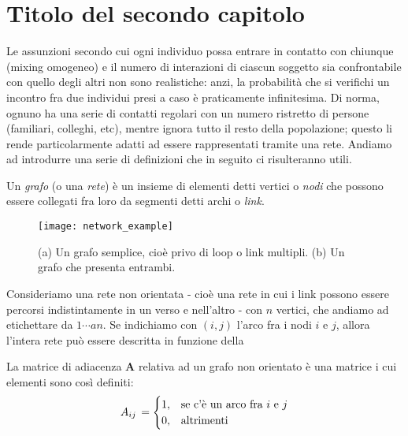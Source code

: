 \chapter{Titolo del secondo capitolo}
\label{chap:cap2}

Le assunzioni secondo cui ogni individuo possa entrare in contatto con chiunque (mixing omogeneo) e il numero di interazioni di ciascun soggetto sia confrontabile con quello degli altri non sono realistiche: anzi, la probabilità che si verifichi un incontro fra due individui presi a caso è praticamente infinitesima. Di norma, ognuno ha una serie di contatti regolari con un numero ristretto di persone (familiari, colleghi, etc), mentre ignora tutto il resto della popolazione; questo li rende particolarmente adatti ad essere rappresentati tramite una rete.
\medskip 
Andiamo ad introdurre una serie di definizioni che in seguito ci risulteranno utili. \\
\begin{definizione}
Un \emph{grafo} (o una \emph{rete}) è un insieme di elementi detti vertici o \emph{nodi} che possono essere collegati fra loro da segmenti detti archi o \emph{link}.
\end{definizione}
\begin{figure}
		\begin{center}
			\texttt{[image: network\_example]}
			\caption{(a) Un grafo semplice, cioè privo di loop o link multipli. (b) Un grafo che presenta entrambi. \cite{Newman}}
			\label{fig:net_ex}
		\end{center}
	\end{figure}
	
Consideriamo una rete non orientata - cioè una rete in cui i link possono essere percorsi indistintamente in un verso e nell'altro - con $ n $ vertici, che andiamo ad etichettare da $ 1 \cdots a n $. Se indichiamo con $ \left( i, j \right) $ l'arco fra i nodi $ i $ e $ j $, allora l'intera rete può essere descritta in funzione della
\begin{definizione}
La matrice di adiacenza \textbf{A} relativa ad un grafo non orientato è una matrice i cui elementi sono così definiti:
\[
A_{ij} \, =
\begin{cases}
1, & \text{se c'è un arco fra $ i $ e $ j $}\\
0, & \text{altrimenti}
\end{cases}
\]
\end{definizione}